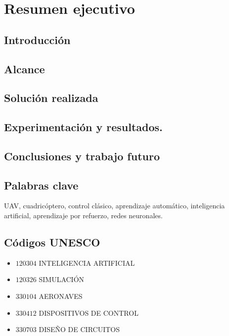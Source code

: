 
\chapter*{Resumen ejecutivo}
\section*{Introducción}

\section*{Alcance}

\section*{Solución realizada}



\section*{Experimentación y resultados.}

\section*{Conclusiones y trabajo futuro}

\section*{Palabras clave}
UAV, cuadricóptero, control clásico, aprendizaje automático, inteligencia artificial, aprendizaje por refuerzo, redes neuronales.

\section*{Códigos UNESCO}
\begin{itemize}
	\item[] $120304$ \quad INTELIGENCIA ARTIFICIAL
	\item[] $120326$ \quad SIMULACIÓN
	\item[] $330104$ \quad AERONAVES
	\item[] $330412$ \quad DISPOSITIVOS DE CONTROL
	\item[] $330703$ \quad DISEÑO DE CIRCUITOS 

\end{itemize}
\newpage
\cleardoublepage